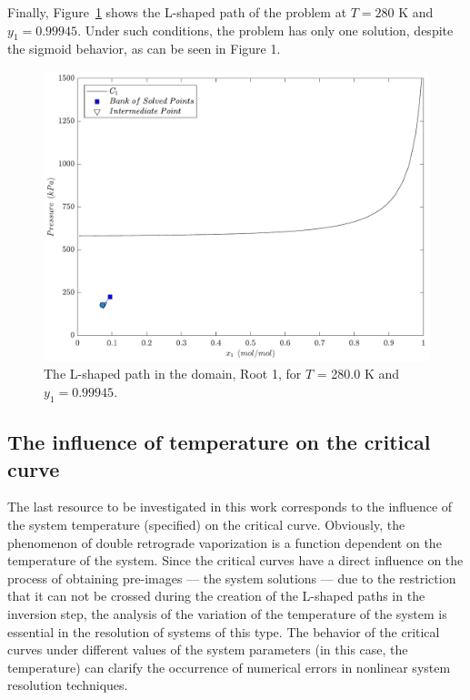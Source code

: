 \documentclass[journal=iecred,manuscript=article]{achemso}
\theoremstyle{definition}
\theoremstyle{remark}
\begin{document}
Finally, Figure~\ref{fig:L_S2-fig11} shows the L-shaped path of the problem at $T = 280$ K and $y_1 = 0.99945$. Under such conditions, the problem has only one solution, despite the sigmoid behavior, as can be seen in Figure 1.

\begin{figure}[!ht]
	\begin{center}
		\includegraphics[scale=0.50]{caminhos_L_degeneracao_dominio3.pdf}
		\caption{The L-shaped path in the domain, Root 1, for $T$ = 280.0 K and $y_1 = 0.99945$.}\label{fig:L_S2-fig11}
	\end{center}
\end{figure}

\subsection{The influence of temperature on the critical curve}

The last resource to be investigated in this work corresponds to the influence of the system temperature (specified) on the critical curve. Obviously, the phenomenon of double retrograde vaporization is a function dependent on the temperature of the system. Since the critical curves have a direct influence on the process of obtaining pre-images --- the system solutions --- due to the restriction that it can not be crossed during the creation of the L-shaped paths in the inversion step, the analysis of the variation of the temperature of the system is essential in the resolution of systems of this type. The behavior of the critical curves under different values of the system parameters (in this case, the temperature) can clarify the occurrence of numerical errors in nonlinear system resolution techniques.
\end{document}
